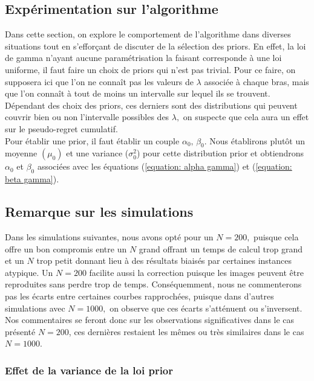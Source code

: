 \documentclass[letterpaper,11pt]{article}
\begin{document}
\subsection{Expérimentation sur l'algorithme}

Dans cette section, on explore le comportement de l'algorithme dans diverses situations tout en s'efforçant de discuter de la sélection des priors. En effet, la loi de gamma n'ayant aucune paramétrisation la faisant corresponde à une loi uniforme, il faut faire un choix de priors qui n'est pas trivial. Pour ce faire, on supposera ici que l'on ne connaît pas les valeurs de $\lambda$ associée à chaque bras, mais que l'on connaît à tout de moins un intervalle sur lequel ils se trouvent. Dépendant des choix des priors, ces derniers sont des distributions qui peuvent couvrir bien ou non l'intervalle possibles des $\lambda,$ on suspecte que cela aura un effet sur le pseudo-regret cumulatif.\\

Pour établir une prior, il faut établir un couple $\alpha_0,\,\beta_0.$ Nous établirons plutôt un moyenne $(\mu_0)$ et une variance ($\sigma_0^2$) pour cette distribution prior et obtiendrons $\alpha_0$ et $\beta_0$ associées avec les équations (\ref{equation: alpha gamma}) et (\ref{equation: beta gamma}).

\subsection*{Remarque sur les simulations}

Dans les simulations suivantes, nous avons opté pour un $N=200,$ puisque cela offre un bon compromis entre un $N$  grand offrant un temps de calcul trop grand et un $N$ trop petit donnant lieu à des résultats biaisés par certaines instances atypique. Un $N=200$ facilite aussi la correction puisque les images peuvent être reproduites sans perdre trop de temps. Conséquemment, nous ne commenterons pas les écarts entre certaines courbes rapprochées, puisque dans d'autres simulations avec $N=1000,$ on observe que ces écarts s'atténuent ou s'inversent. Nos commentaires se feront donc sur les observations significatives dans le cas présenté $N=200$, ces dernières restaient les mêmes  ou très similaires dans le cas $N=1000.$
 
\subsubsection{Effet de la variance de la loi prior}
\end{document}
